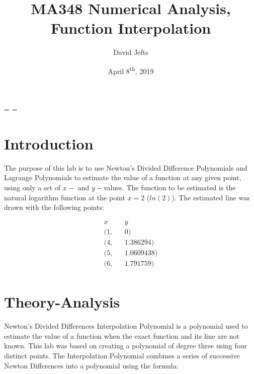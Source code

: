 \documentclass[12pt, letterpaper]{article}
\begin{document}
\setcounter{secnumdepth}{-1}
\binoppenalty=\maxdimen
\relpenalty=\maxdimen

\title{MA348 Numerical Analysis, Function Interpolation}
\author{David Jefts}
\date{April 8\textsuperscript{th}, 2019}
\begin{titlepage}
	\centering
	\maketitle
	\centering
	\hfill
	\vfill
	\thispagestyle{empty}
\end{titlepage}

\setlength{\voffset}{-0.5in}
\setlength{\headsep}{10pt}

\section{\label{sec:intro}Introduction}
	The purpose of this lab is to use Newton's Divided Difference Polynomials and Lagrange Polynomials to estimate the value of a function at any given point, using only a set of $x-$ and $y-$values. The function to be estimated is the natural logarithm function at the point $x=2$ ($ln(2)$). The estimated line was drawn with the following points:
		
	\begin{align*}
		x && y \\
		(1, && 0) \\
		(4, && 1.386294) \\
		(5, && 1.0609438) \\
		(6, && 1.791759) \\
	\end{align*}

\section{\label{sec:theory}Theory-Analysis}
	 Newton's Divided Differences Interpolation Polynomial is a polynomial used to estimate the value of a function when the exact function and its line are not known. This lab was based on creating a polynomial of degree three using four distinct points. The Interpolation Polynomial combines a series of successive Newton Differences into a polynomial using the formula:
	 
\end{document}
